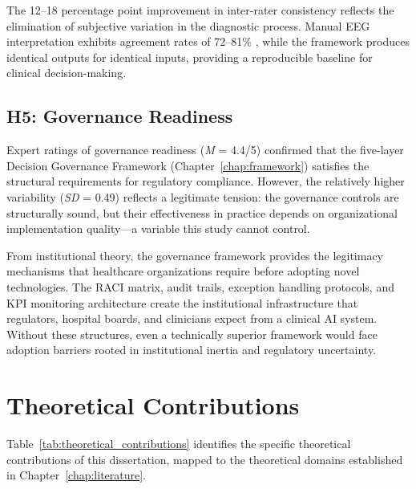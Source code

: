 The 12--18 percentage point improvement in inter-rater consistency reflects the elimination of subjective variation in the diagnostic process. Manual EEG interpretation exhibits agreement rates of 72--81\% \citep{kelly2019healthcare}, while the framework produces identical outputs for identical inputs, providing a reproducible baseline for clinical decision-making.

\subsection{H5: Governance Readiness}

Expert ratings of governance readiness (\textit{M} = 4.4/5) confirmed that the five-layer Decision Governance Framework (Chapter~\ref{chap:framework}) satisfies the structural requirements for regulatory compliance. However, the relatively higher variability (\textit{SD} = 0.49) reflects a legitimate tension: the governance controls are structurally sound, but their effectiveness in practice depends on organizational implementation quality---a variable this study cannot control.

From institutional theory, the governance framework provides the legitimacy mechanisms that healthcare organizations require before adopting novel technologies. The RACI matrix, audit trails, exception handling protocols, and KPI monitoring architecture create the institutional infrastructure that regulators, hospital boards, and clinicians expect from a clinical AI system. Without these structures, even a technically superior framework would face adoption barriers rooted in institutional inertia and regulatory uncertainty.


\section{Theoretical Contributions}
\label{sec:theoretical_contributions}

Table~\ref{tab:theoretical_contributions} identifies the specific theoretical contributions of this dissertation, mapped to the theoretical domains established in Chapter~\ref{chap:literature}.

